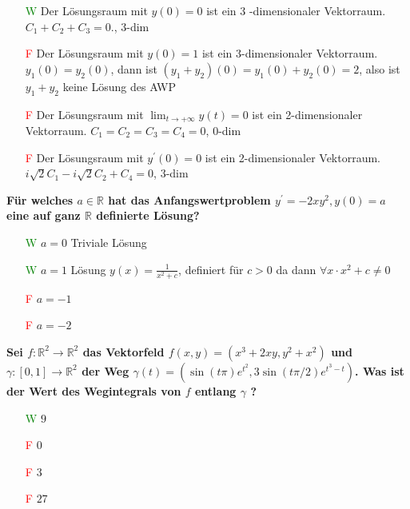 \begin{flushleft}
\begin{itemize}[leftmargin = *]
\item[\textcolor{green}{W}] Der Lösungsraum mit $y(0)=0$ ist ein 3 -dimensionaler Vektorraum. \textcolor{Emerald}{$C_1+C_2+C_3=0$., $3$-dim}
\item[\textcolor{red}{F}]   Der Lösungsraum mit $y(0)=1$ ist ein 3-dimensionaler Vektorraum. \textcolor{Emerald}{ $y_1(0)=y_2(0)$, dann ist $\left(y_1+y_2\right)(0)=y_1(0)+y_2(0)=2$, also ist $y_1+y_2$ keine Lösung des AWP}
\item[\textcolor{red}{F}] Der Lösungsraum mit $\lim _{t \rightarrow+\infty} y(t)=0$ ist ein 2-dimensionaler Vektorraum. \textcolor{Emerald}{$C_1=C_2=C_3=C_4=0$, $0$-dim}
\item[\textcolor{red}{F}] Der Lösungsraum mit $y^{\prime}(0)=0$ ist ein 2-dimensionaler Vektorraum. \textcolor{Emerald}{$i \sqrt{2} C_1-i \sqrt{2} C_2+C_4=0$, $3$-dim}

\end{itemize}




\textbf{Für welches $a \in \mathbb{R}$ hat das Anfangswertproblem $y^{\prime}=-2 x y^2, y(0)=a$ eine auf ganz $\mathbb{R}$ definierte Lösung? }

\begin{itemize}[leftmargin = *]
\item[\textcolor{green}{W}] $a=0$ \textcolor{Emerald}{Triviale Lösung}
\item[\textcolor{green}{W}]   $a=1$ \textcolor{Emerald}{Lösung $y(x)=\frac{1}{x^2+c}$, definiert für $c>0$ da dann $\forall x \cdot x^2 + c \neq 0$}
\item[\textcolor{red}{F}] $a=-1$
\item[\textcolor{red}{F}] $a=-2$

\end{itemize}





\textbf{Sei $f: \mathbb{R}^2 \rightarrow \mathbb{R}^2$ das Vektorfeld $f(x, y)=\left(x^3+2 x y, y^2+x^2\right)$ und $\gamma:[0,1] \rightarrow \mathbb{R}^2$ der Weg $\gamma(t)=\left(\sin (t \pi) e^{t^2}, 3 \sin (t \pi / 2) e^{t^3-t}\right)$. Was ist der Wert des Wegintegrals von $f$ entlang $\gamma$ ? }

\begin{itemize}[leftmargin = *]
\item[\textcolor{green}{W}] $9$
\item[\textcolor{red}{F}]    $0$
\item[\textcolor{red}{F}]   $3$
\item[\textcolor{red}{F}]  $27$
\end{itemize}


\end{flushleft}

